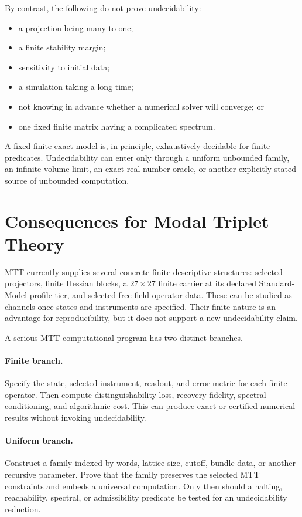 \documentclass[11pt]{article}
\begin{document}
By contrast, the following do not prove undecidability:
\begin{itemize}
\item a projection being many-to-one;
\item a finite stability margin;
\item sensitivity to initial data;
\item a simulation taking a long time;
\item not knowing in advance whether a numerical solver will converge; or
\item one fixed finite matrix having a complicated spectrum.
\end{itemize}
A fixed finite exact model is, in principle, exhaustively decidable for
finite predicates. Undecidability can enter only through a uniform
unbounded family, an infinite-volume limit, an exact real-number oracle, or
another explicitly stated source of unbounded computation.

\section{Consequences for Modal Triplet Theory}

MTT currently supplies several concrete finite descriptive structures:
selected projectors, finite Hessian blocks, a \(27\times27\) finite carrier
at its declared Standard-Model profile tier, and selected free-field
operator data. These can be studied as channels once states and instruments
are specified. Their finite nature is an advantage for reproducibility, but
it does not support a new undecidability claim.

A serious MTT computational program has two distinct branches.

\paragraph{Finite branch.}
Specify the state, selected instrument, readout, and error metric for each
finite operator. Then compute distinguishability loss, recovery fidelity,
spectral conditioning, and algorithmic cost. This can produce exact or
certified numerical results without invoking undecidability.

\paragraph{Uniform branch.}
Construct a family indexed by words, lattice size, cutoff, bundle data, or
another recursive parameter. Prove that the family preserves the selected
MTT constraints and embeds a universal computation. Only then should a
halting, reachability, spectral, or admissibility predicate be tested for an
undecidability reduction.
\end{document}
